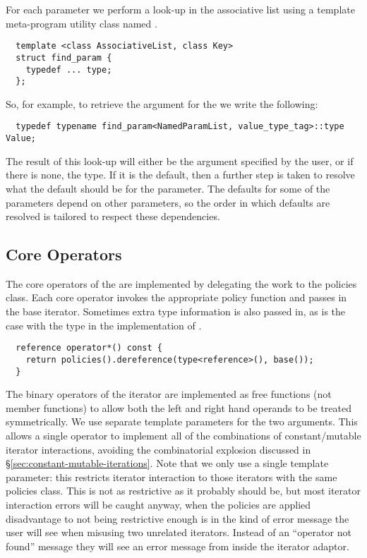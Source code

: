\documentclass{netobjectdays}
\begin{document}
\noindent For each parameter we perform a look-up in the associative
list using a template meta-program utility class named
.

{\footnotesize
\begin{verbatim} 
  template <class AssociativeList, class Key>
  struct find_param {
    typedef ... type;
  };
\end{verbatim} 
}

\noindent So, for example, to retrieve the argument for the
 we write the following:

{\footnotesize
\begin{verbatim} 
  typedef typename find_param<NamedParamList, value_type_tag>::type Value;
\end{verbatim} 
}

The result of this look-up will either be the argument specified by the
user, or if there is none, the  type. If it is
the default, then a further step is taken to resolve what the default
should be for the parameter. The defaults for some of the parameters
depend on other parameters, so the order in which defaults are
resolved is tailored to respect these dependencies.


\subsection{Core Operators}

The core operators of the  are implemented by
delegating the work to the policies class. Each core operator invokes
the appropriate policy function and passes in the base
iterator. Sometimes extra type information is also passed in, as is
the case with the  type in the implementation of
.

{\footnotesize
\begin{verbatim}
  reference operator*() const {
    return policies().dereference(type<reference>(), base());
  }
\end{verbatim}
}

The binary operators of the iterator are implemented as free functions
(not member functions) to allow both the left and right hand operands
to be treated symmetrically.  We use separate template parameters for
the two  arguments. This allows a single
operator to implement all of the combinations of constant/mutable
iterator interactions, avoiding the combinatorial explosion discussed
in \S\ref{sec:constant-mutable-iterations}. Note that we only use a
single  template parameter: this restricts iterator
interaction to those iterators with the same policies class.  This is
not as restrictive as it probably should be, but most iterator
interaction errors will be caught anyway, when the policies are applied
disadvantage to not being restrictive enough is in the kind of error
message the user will see when misusing two unrelated
iterators. Instead of an ``operator not found'' message they will see
an error message from inside the iterator adaptor.
\end{document}
